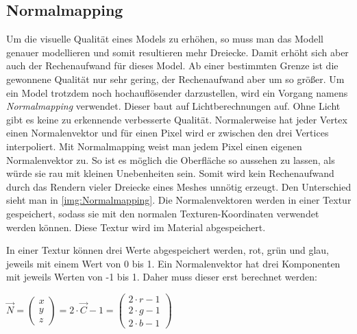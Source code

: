 \subsection{Normalmapping}
\label{section:Normalmapping}

Um die visuelle Qualität eines Models zu erhöhen, so muss man das Modell genauer modellieren und somit resultieren mehr Dreiecke. 
Damit erhöht sich aber auch der Rechenaufwand für dieses Model. Ab einer bestimmten Grenze ist die gewonnene Qualität nur sehr gering, der Rechenaufwand aber um so größer. 
Um ein Model trotzdem noch hochauflösender darzustellen, wird ein Vorgang namens \textit{Normalmapping} verwendet. 
Dieser baut auf Lichtberechnungen auf. Ohne Licht gibt es keine zu erkennende verbesserte Qualität. Normalerweise hat jeder Vertex einen Normalenvektor und für einen Pixel wird er zwischen den drei Vertices interpoliert. 
Mit Normalmapping weist man jedem Pixel einen eigenen Normalenvektor zu. So ist es möglich die Oberfläche so aussehen zu lassen, als würde sie rau mit kleinen Unebenheiten sein. Somit wird kein Rechenaufwand durch das Rendern vieler Dreiecke eines Meshes unnötig erzeugt.
Den Unterschied sieht man in \cref{img:Normalmapping}. Die Normalenvektoren werden in einer Textur gespeichert, sodass sie mit den normalen Texturen-Koordinaten verwendet werden können. Diese Textur wird im Material abgespeichert.

In einer Textur können drei Werte abgespeichert werden, rot, grün und glau, jeweils mit einem Wert von 0 bis 1. Ein Normalenvektor hat drei Komponenten mit jeweils Werten von -1 bis 1. Daher muss dieser erst berechnet werden:

$ \overrightarrow{N} = 
\begin{pmatrix}
x \\ y \\ z
\end{pmatrix}
 = 2 \cdot \overrightarrow{C} - 1 = 
 \begin{pmatrix}
 2 \cdot r - 1 \\ 2 \cdot g - 1 \\ 2 \cdot b - 1
 \end{pmatrix}$
 
